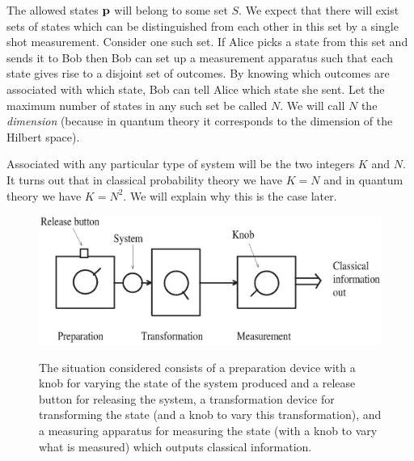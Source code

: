 \documentclass[10pt]{article}
\begin{document}
The allowed states ${\bf p}$ will belong to some set $S$.  We expect
that there will exist sets of states which can be distinguished from each other
in this set by a single shot measurement.  Consider one such set. If
Alice picks a state from this set and sends it to Bob
then Bob can set up a measurement
apparatus such that each state gives rise to a disjoint set of outcomes.
By knowing which outcomes are associated with which state, Bob can tell
Alice which state she sent.  Let the maximum number of states in any
such set be called $N$.  We will call $N$ the {\it dimension} (because in
quantum theory it corresponds to the dimension of the Hilbert space).

Associated with any particular type of system will be the two integers
$K$ and $N$.  It turns out that in classical probability theory we have
$K=N$ and in quantum theory we have $K=N^2$.  We will explain why this
is the case later.

\begin{figure}[t]
\resizebox{\textwidth}{!}
{\includegraphics{qaxiomf1.eps}}
\caption{\small The situation considered consists of a preparation device with
a knob for varying the state of the system produced and a release button
for releasing the system, a transformation device for transforming the
state (and a knob to vary this transformation), and a measuring
apparatus for measuring the state (with a knob to vary what is measured)
which outputs classical information.}
\end{figure}
\end{document}
